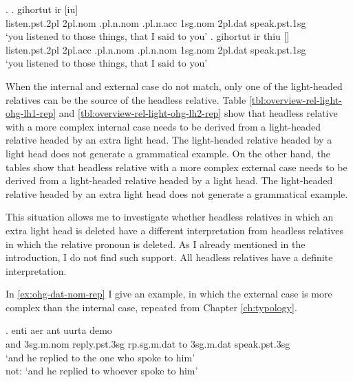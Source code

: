 \ex.
\ag. gihortut ir [iu]    \\
 listen.\ac{pst}.2\ac{pl}\scsub{[acc]} 2\ac{pl}.\ac{nom} .\ac{pl}.\ac{n}.\ac{nom} .\ac{pl}.\ac{n}.\ac{acc} 1\ac{sg}.\ac{nom} 2\ac{pl}.\ac{dat} speak.\ac{pst}.1\ac{sg}\scsub{[acc]}\\
 `you listened to those things, that I said to you' \label{ex:ohg-acc-acc-rep-elh}
\bg. gihortut ir thiu []   \\
 listen.\ac{pst}.2\ac{pl}\scsub{[acc]} 2\ac{pl}.\ac{acc} .\ac{pl}.\ac{n}.\ac{nom} .\ac{pl}.\ac{n}.\ac{nom} 1\ac{sg}.\ac{nom} 2\ac{pl}.\ac{dat} speak.\ac{pst}.1\ac{sg}\scsub{[acc]}\\
 `you listened to those things, that I said to you' \label{ex:ohg-acc-acc-rep-lh}

When the internal and external case do not match, only one of the light-headed relatives can be the source of the headless relative.
Table \ref{tbl:overview-rel-light-ohg-lh1-rep} and \ref{tbl:overview-rel-light-ohg-lh2-rep} show that headless relative with a more complex internal case needs to be derived from a light-headed relative headed by an extra light head. The light-headed relative headed by a light head does not generate a grammatical example.
On the other hand, the tables show that headless relative with a more complex external case needs to be derived from a light-headed relative headed by a light head. The light-headed relative headed by an extra light head does not generate a grammatical example.

This situation allows me to investigate whether headless relatives in which an extra light head is deleted have a different interpretation from headless relatives in which the relative pronoun is deleted. As I already mentioned in the introduction, I do not find such support. All headless relatives have a definite interpretation.

In \ref{ex:ohg-dat-nom-rep} I give an example, in which the external case is more complex than the internal case, repeated from Chapter \ref{ch:typology}.

\exg. enti aer {ant uurta} demo  \\
and 3\ac{sg}.\ac{m}.\ac{nom} reply.\ac{pst}.3\ac{sg}\scsub{[dat]} \ac{rp}.\ac{sg}.\ac{m}.\ac{dat} {to 3\ac{sg}.\ac{m}.\ac{dat}} speak.\ac{pst}.3\ac{sg}\scsub{[nom]}\\
`and he replied to the one who spoke to him'\\
not: `and he replied to whoever spoke to him'
 \label{ex:ohg-dat-nom-rep}

